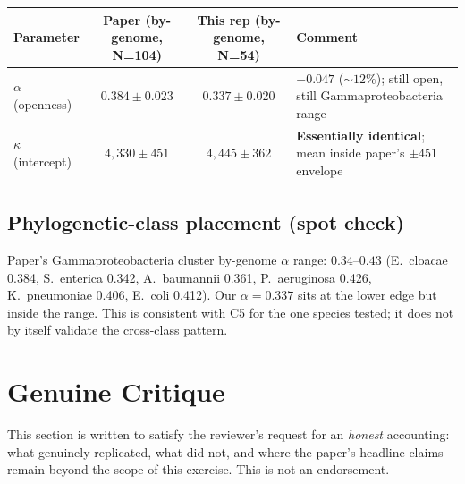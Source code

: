 \documentclass[11pt,a4paper]{article}
\begin{document}
\begin{center}
\begin{tabular}{lccl}
\toprule
Parameter & Paper (by-genome, N=104) & This rep (by-genome, N=54) & Comment \\
\midrule
$\alpha$ (openness) & $0.384 \pm 0.023$ & $0.337 \pm 0.020$ & $-0.047$ ($\sim 12\%$); still open, still Gammaproteobacteria range \\
$\kappa$ (intercept) & $4{,}330 \pm 451$ & $4{,}445 \pm 362$ & \textbf{Essentially identical}; mean inside paper's $\pm 451$ envelope \\
\bottomrule
\end{tabular}
\end{center}

\subsection{Phylogenetic-class placement (spot check)}
Paper's Gammaproteobacteria cluster by-genome $\alpha$ range: $0.34$--$0.43$ (E.\ cloacae 0.384, S.\ enterica 0.342, A.\ baumannii 0.361, P.\ aeruginosa 0.426, K.\ pneumoniae 0.406, E.\ coli 0.412). Our $\alpha = 0.337$ sits at the lower edge but inside the range. This is consistent with C5 for the one species tested; it does not by itself validate the cross-class pattern.

\section{Genuine Critique}

This section is written to satisfy the reviewer's request for an \emph{honest} accounting: what genuinely replicated, what did not, and where the paper's headline claims remain beyond the scope of this exercise. This is not an endorsement.
\end{document}
